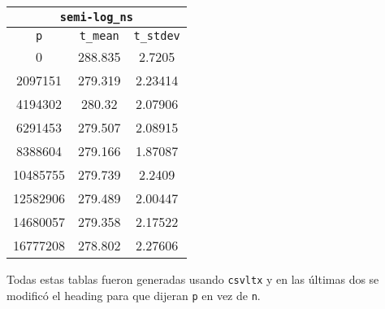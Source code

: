 \documentclass{scrartcl}
\begin{document}
\begin{center}
\begin{tabular}{|c|c|c|}
    \hline
    \multicolumn{3}{|c|}{\texttt{semi-log\_ns}} \\
    \hline
    \texttt{p} & \texttt{t\_mean} & \texttt{t\_stdev} \\
    \hline
    0 & 288.835 & 2.7205 \\
    \hline
    2097151 & 279.319 & 2.23414 \\
    \hline
    4194302 & 280.32 & 2.07906 \\
    \hline
    6291453 & 279.507 & 2.08915 \\
    \hline
    8388604 & 279.166 & 1.87087 \\
    \hline
    10485755 & 279.739 & 2.2409 \\
    \hline
    12582906 & 279.489 & 2.00447 \\
    \hline
    14680057 & 279.358 & 2.17522 \\
    \hline
    16777208 & 278.802 & 2.27606 \\
    \hline
\end{tabular}
\end{center}

Todas estas tablas fueron generadas usando \texttt{csvltx} y en las últimas dos se modificó el heading
para que dijeran \texttt{p} en vez de \texttt{n}. 
\end{document}
